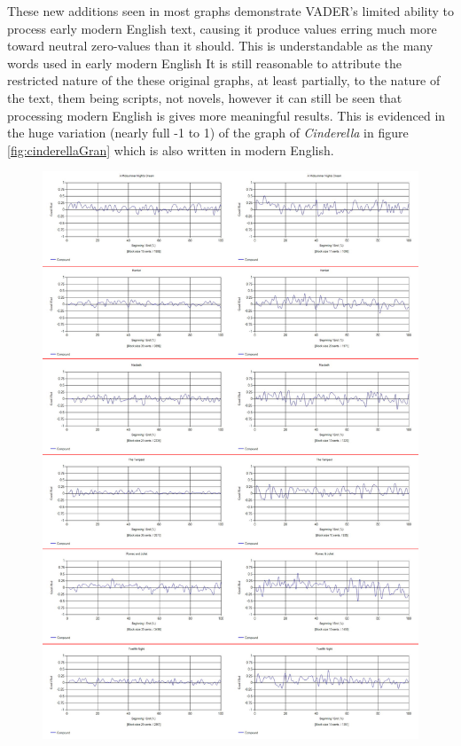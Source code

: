 \documentclass{article}
\begin{document}
{        These new additions seen in most graphs demonstrate VADER's limited ability to process early modern English text, causing it produce values erring much more toward neutral zero-values than it should. This is understandable as the many words used in early modern English It is still reasonable to attribute the restricted nature of the these original graphs, at least partially, to the nature of the text, them being scripts, not novels, however it can still be seen that processing modern English is gives more meaningful results. This is evidenced in the huge variation (nearly full -1 to 1) of the graph of \textit{Cinderella} in figure \ref{fig:cinderellaGran} which is also written in modern English.
        \begin{figure}
            \includegraphics[width=1\textwidth]{Figures/EMvsM/EMvsMAll}

\end{figure}}
\end{document}
